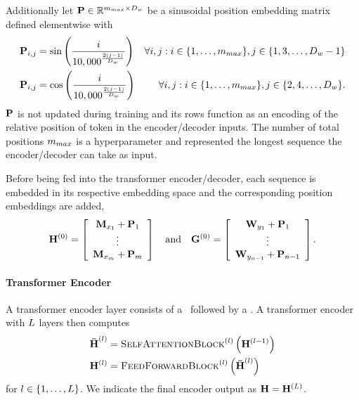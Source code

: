   Additionally let $\mathbf{P} \in \mathbb{R}^{m_{max} \times D_{w}}$ be a sinusoidal position embedding matrix
  defined elementwise with 
 \begin{align*}
     \mathbf{P}_{i,j} & = \sin\left(\frac{i}{10,000^{ \frac{2(j-1)}{D_{w}} }}\right) & \forall i,j : i \in \{1,\ldots,m_{max}\}, j \in \{1,3,\ldots, D_{w} - 1\} \\
     \mathbf{P}_{i,j} & = \cos\left(\frac{i}{10,000^{ \frac{2(j-1)}{D_{w}} }}\right) & \forall i,j : i \in \{1,\ldots, m_{max}\}, j \in \{2,4,\ldots,D_{w}\}. 
  \end{align*} $\mathbf{P}$ is not updated during training and its rows
  function as an encoding of the relative position of token in the encoder/decoder inputs. The number of total positions $m_{max}$ is a hyperparameter
  and represented the longest sequence the encoder/decoder can take as input.

Before being fed into the transformer encoder/decoder, each sequence is 
embedded in its respective embedding space and the corresponding
position embeddings are added,
\[\mathbf{H}^{(0)} = \left[ \begin{array}{c}\mathbf{M}_{x_1} + \mathbf{P}_1\\
\vdots \\ \mathbf{M}_{x_{m}} + \mathbf{P}_{m} \end{array}\right] 
\quad \textrm{and} \quad 
\mathbf{G}^{(0)} = \left[ \begin{array}{c}\mathbf{W}_{y_1} + \mathbf{P}_1\\
\vdots \\ \mathbf{W}_{y_{n-1}} + \mathbf{P}_{n-1} \end{array}\right].
\]

\paragraph{{Transformer Encoder}}
A transformer encoder layer consists of a \selfattentionblock~followed
    by a \feedforwardblock.
 A transformer encoder with $L$ layers
    then computes
\begin{align*} 
    {\boldsymbol{\bar{\mathbf{H}}}^{(l)}} & = \textsc{SelfAttentionBlock}^{(l)}
\left(\mathbf{H}^{(l-1)}\right) \\
    \mathbf{H}^{(l)} & = \textsc{FeedForwardBlock}^{(l)}\left({\boldsymbol{\bar{\mathbf{H}}}^{(l)}}\right)
\end{align*} for $l \in \{1,\ldots,L\}$.
We indicate the final encoder output as $\mathbf{H} =  \mathbf{H}^{(L)}$.
 

